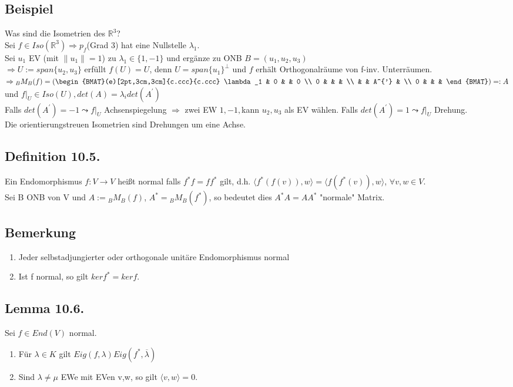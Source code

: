 \documentclass[a4paper, 12pt]{extarticle}
\newcommand{\norm}[1]{
	\parallel #1 \parallel
}
\newcommand{\skalar}[2] {
	\langle #1, #2\rangle
}
\begin{document}
\subsection*{Beispiel}
Was sind die Isometrien des $\mathbb{R}^3$?\\
Sei $f\in Iso(\mathbb{R}^3) \Rightarrow p_f$(Grad 3) hat eine Nullstelle $\lambda_1$.\\
Sei $u_1$ EV (mit $\norm{u_1} = 1$) zu $\lambda_1 \in  \{1, -1\}$ und ergänze zu ONB $B = (u_1, u_2, u_3)$\\
$\Rightarrow U:= span\{u_2,u_3\}$ erfüllt $f(U) = U$, denn $U = span\{u_1\}^{\perp}$ und $f$ erhält Orthogonalräume von f-inv. Unterräumen.\\
$\Rightarrow {}_BM_B(f) = \left(\begin{BMAT}(e)[2pt,3cm,3cm]{c.ccc}{c.ccc}
	\lambda_1 & 0 & & 0 \\
	0 & & & \\
	& & A^{'} & \\
	0 & & & 
\end{BMAT}\right) =: A$ und $f|_U \in Iso(U), det(A) = \lambda_i det(A^{'})$\\
Falls $det(A^{'}) = -1 \leadsto f|_U$ Achsenspiegelung $\Rightarrow$ zwei EW $1, -1,$kann $u_2, u_3$ als EV wählen.
Falls $det(A^{'}) = 1 \leadsto f|_U$ Drehung.\\
Die orientierungstreuen Isometrien sind Drehungen um eine Achse.
\subsection*{Definition 10.5.}
Ein Endomorphismus $f:V\to V$ heißt normal falls $f^*f = ff^*$ gilt, d.h. $\skalar{f^*(f(v))}{w} = \skalar{f(f^*(v))}{w}$, $\forall v,w\in V$. \\
Sei B ONB von V und $A:={}_BM_B(f)$, $A^*={}_BM_B(f^*)$, so bedeutet dies $A^*A=AA^*$ "normale" Matrix.
\subsection*{Bemerkung}
\begin{enumerate}[label=\alph*)]
	\item Jeder selbstadjungierter oder orthogonale unitäre Endomorphismus normal
	\item Ist f normal, so gilt $kerf^*=ker f$.
\end{enumerate}
\subsection*{Lemma 10.6.}
Sei $f\in End(V)$ normal.
\begin{enumerate}[label=\alph*)]
	\item Für $\lambda\in K$ gilt $Eig(f,\lambda) Eig(f^*,\overline\lambda)$
	\item Sind $\lambda\neq\mu$ EWe mit EVen v,w, so gilt $\skalar{v}{w}=0$.
\end{enumerate}
\end{document}
